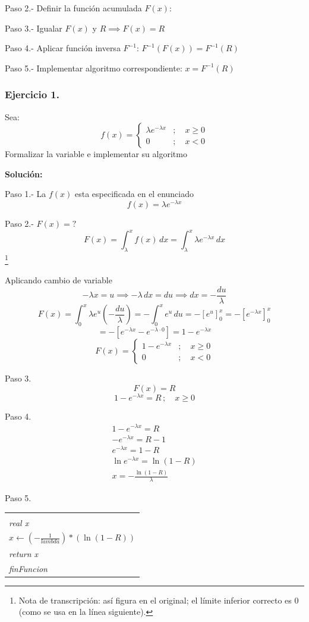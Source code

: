 \documentclass[11pt,letterpaper]{report}
\newenvironment{algoritmo}
  {\begin{center}\begin{tabular}{|p{0.85\textwidth}|}\hline\vspace{-0.2cm}\begin{tabbing}\hspace{0.6cm}\=\hspace{0.6cm}\=\hspace{0.6cm}\=\hspace{0.6cm}\=\hspace{0.6cm}\=\kill}
  {\end{tabbing}\vspace{-0.4cm}\\\hline\end{tabular}\end{center}}
\begin{document}
Paso 2.- Definir la función acumulada $F(x)$:

Paso 3.- Igualar $F(x)$ y $R \implies F(x) = R$

Paso 4.- Aplicar función inversa $F^{-1}$: $F^{-1}(F(x)) = F^{-1}(R)$

Paso 5.- Implementar algoritmo correspondiente: $x = F^{-1}(R)$

\subsubsection*{Ejercicio 1.}

Sea:
\[
f(x) = \begin{cases}
\lambda e^{-\lambda x} & ;\quad x \geq 0\\
0 & ;\quad x < 0
\end{cases}
\]
Formalizar la variable e implementar su algoritmo

\textbf{Solución:}

Paso 1.- La $f(x)$ esta especificada en el enunciado
\[
f(x) = \lambda e^{-\lambda x}
\]

Paso 2.- $F(x) = ?$
\[
F(x) = \int_\lambda^x f(x)\,dx = \int_\lambda^x \lambda e^{-\lambda x}\,dx
\]
\footnote{Nota de transcripción: así figura en el original; el límite inferior correcto es $0$ (como se usa en la línea siguiente).}

Aplicando cambio de variable
\[
-\lambda x = u \implies -\lambda\,dx = du \implies dx = -\frac{du}{\lambda}
\]
\[
F(x) = \int_0^x \lambda e^{u}\left(-\frac{du}{\lambda}\right) = -\int_0^x e^u\,du = -[e^u]_0^x = -[e^{-\lambda x}]_0^x
\]
\[
= -[e^{-\lambda x} - e^{-\lambda \cdot 0}] = 1 - e^{-\lambda x}
\]
\[
F(x) = \begin{cases}
1 - e^{-\lambda x} & ;\quad x \geq 0\\
0 & ;\quad x < 0
\end{cases}
\]

Paso 3.
\[
F(x) = R
\]
\[
1 - e^{-\lambda x} = R\,;\quad x \geq 0
\]

Paso 4.
\begin{gather*}
1 - e^{-\lambda x} = R\\
-e^{-\lambda x} = R - 1\\
e^{-\lambda x} = 1 - R\\
\ln e^{-\lambda x} = \ln(1 - R)\\
x = -\frac{\ln(1 - R)}{\lambda}
\end{gather*}

Paso 5.

\begin{algoritmo}
\textit{real funcion variableExponencial(real lambda, real R)}\\
\>\textit{real x}\\
\>$x \leftarrow \left(-\frac{1}{lambda}\right) * (\ln(1 - R))$\\
\>\textit{return x}\\
\textit{finFuncion}
\end{algoritmo}
\end{document}
